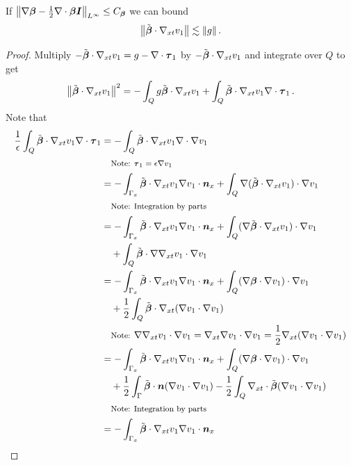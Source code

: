\documentclass[Dissertation.tex]{subfiles}
\begin{document}
\begin{lemma}
\label{lem:convective}
If 
$
\left\| \nabla\boldsymbol\beta-\frac{1}{2}\nabla\cdot\boldsymbol\beta\boldsymbol I \right\|_{L^{\infty}}\le C_{\boldsymbol\beta}
$
we can bound
\[
\left\| \tilde{\boldsymbol\beta}\cdot\nabla_{xt} v_1 \right\|\lesssim \left\| g \right\|.
\]
\end{lemma}
\begin{proof}
Multiply $-\tilde{\boldsymbol\beta}\cdot\nabla_{xt} v_1=g-\nabla\cdot\boldsymbol\tau_1$ by $-\tilde{\boldsymbol\beta}\cdot\nabla_{xt} v_1$ and integrate over $Q$ to get
\begin{equation}
\label{eq:adj1}
\left\| \tilde{\boldsymbol\beta}\cdot\nabla_{xt} v_1 \right\|^2=-\int_Q g\tilde{\boldsymbol\beta}\cdot\nabla_{xt} v_1+\int_Q\tilde{\boldsymbol\beta}\cdot\nabla_{xt} v_1\nabla\cdot\boldsymbol\tau_1\,.
\end{equation}
Note that
\begin{align*}
\frac{1}{\epsilon}\int_Q\tilde\bfbeta\cdot\Gradxt v_1\Div\bftau_1&=-\int_Q\tilde\bfbeta\cdot\Gradxt v_1\Div\Grad v_1 \\
&\quad\footnotesize{\text{Note: }\bftau_1=\epsilon\Grad v_1}
\\
%
&=-\int_{\Gamma_x}\tilde\bfbeta\cdot\Gradxt v_1\Grad v_1\cdot\bfn_x
+\int_Q\Grad(\tilde\bfbeta\cdot\Gradxt v_1)\cdot\Grad v_1 \\
&\quad\footnotesize{\text{Note: Integration by parts}}
\\
%
&=-\int_{\Gamma_x}\tilde\bfbeta\cdot\Gradxt v_1\Grad v_1\cdot\bfn_x
+\int_Q(\Grad\tilde\bfbeta\cdot\Gradxt v_1)\cdot\Grad v_1
\\&\quad
+\int_Q\tilde\bfbeta\cdot\Grad\Gradxt v_1\cdot\Grad v_1\\
%
&=-\int_{\Gamma_x}\tilde\bfbeta\cdot\Gradxt v_1\Grad v_1\cdot\bfn_x
+\int_Q(\Grad\bfbeta\cdot\Grad v_1)\cdot\Grad v_1
\\&\quad
+\frac{1}{2}\int_Q\tilde\bfbeta\cdot\Gradxt(\Grad v_1\cdot\Grad v_1)\\
&\quad\footnotesize{\text{Note: }\Grad\Gradxt v_1\cdot\Grad v_1=\Gradxt\Grad v_1\cdot\Grad v_1=\frac{1}{2}\Gradxt(\Grad v_1\cdot\Grad v_1)}
\\
%
&=-\int_{\Gamma_x}\tilde\bfbeta\cdot\Gradxt v_1\Grad v_1\cdot\bfn_x
+\int_Q(\Grad\bfbeta\cdot\Grad v_1)\cdot\Grad v_1
\\&\quad
+\frac{1}{2}\int_\Gamma\tilde\bfbeta\cdot\bfn(\Grad v_1\cdot\Grad v_1)
-\frac{1}{2}\int_Q\Divxt\tilde\bfbeta(\Grad v_1\cdot\Grad v_1)\\
&\quad\footnotesize{\text{Note: Integration by parts}}
\\
%
&=-\int_{\Gamma_x}\tilde\bfbeta\cdot\Gradxt v_1\Grad v_1\cdot\bfn_x

\end{align*}
\end{proof}
\end{document}
